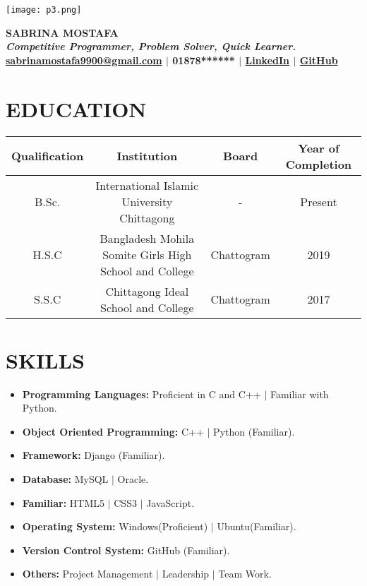 \documentclass[a4paper,10pt]{article}
\begin{document}
	
	
	\begin{center}
		\texttt{[image: p3.png]}\\
	\end{center}
	
	\begin{center}
		\textbf{\LARGE  SABRINA MOSTAFA} \\
		\vspace{5pt}
		\textit{ \textbf{Competitive Programmer, Problem Solver, Quick Learner.} } \\
		\vspace{5pt}
		\textbf{ \href{mailto:sabrinamostafa9900@gmail.com}{sabrinamostafa9900@gmail.com} \! $\vert$ 01878****** \! $\vert$ \href{https://www.linkedin.com/in/sabrina-mostafa-389114207/}{LinkedIn} \! $\vert$ \href{https://github.com/sabrina-mostafa}{GitHub} }
	\end{center}
	
	
	
	\section*{EDUCATION}
	\begin{tabular}{|c|c|c|c|}
		\hline
		\textbf{Qualification} & \textbf{Institution} & \textbf{Board} & \textbf{Year of Completion} \\
		\hline
		B.Sc. & International Islamic University Chittagong & - & Present \\
		\hline
		H.S.C & Bangladesh Mohila Somite Girls High School and College & Chattogram & 2019\\
		\hline
		S.S.C & Chittagong Ideal School and College & Chattogram & 2017\\
		\hline
	\end{tabular}
	
	
	
	\section*{SKILLS}
	\begin{itemize}[left=0pt]
		\item \textbf{Programming Languages:} Proficient in C and C++ $|$ Familiar with Python.
		\item \textbf{Object Oriented Programming:} C++ $|$ Python (Familiar).
		\item \textbf{Framework:} Django (Familiar).
		\item \textbf{Database:} MySQL $|$ Oracle.		
		\item \textbf{Familiar:} HTML5 $|$ CSS3 $|$ JavaScript.
		\item \textbf{Operating System:} Windows(Proficient) $|$ Ubuntu(Familiar).
		\item \textbf{Version Control System:} GitHub (Familiar).
		\item \textbf{Others:} Project Management $|$ Leadership $|$ Team Work.
	\end{itemize}
	
\end{document}
